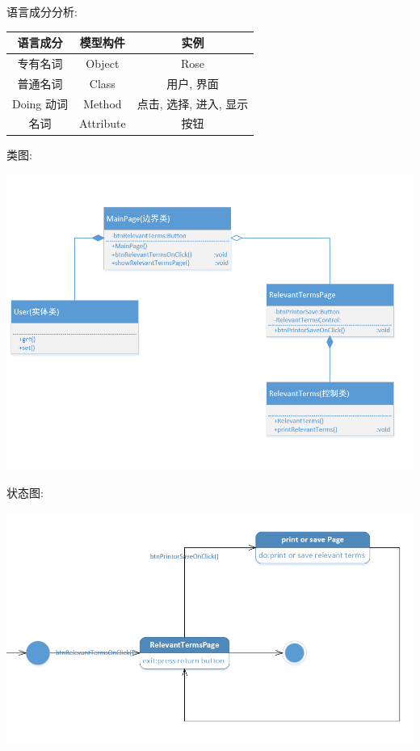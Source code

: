 \documentclass[11pt]{article}
\begin{document}
			语言成分分析: \\
			\begin{center}
			\begin{tabular}{|c|c|c|}
			\hline
			语言成分 & 模型构件 & 实例\\ \hline
			专有名词 & Object & Rose  \\ \hline
			普通名词 & Class & 用户, 界面 \\ \hline
			Doing 动词 & Method & 点击, 选择, 进入, 显示 \\ \hline
			名词 & Attribute & 按钮 \\ \hline
			\end{tabular}
			\end{center}
			
			类图: 
			\begin{center}
			\includegraphics[scale=0.42]{4.2类图.png}
			\end{center}

			状态图: 
			\begin{center}
			\includegraphics[scale=0.42]{4.2状态图.png}
			\end{center}
\end{document}
